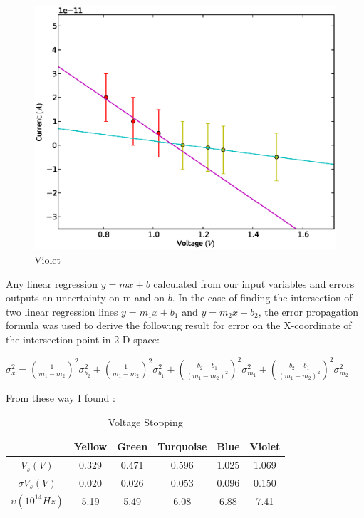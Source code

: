 \documentclass[aps,nofootinbib,onecolumn,groupedaddress,a4paper]{revtex4}
\begin{document}
\begin{figure}[h]
\caption{Violet \label{rawplot}}
\includegraphics[width=1.0 \columnwidth]{mor.eps}
\end{figure}

Any linear regression $y = mx + b$ calculated from our
input variables and errors outputs an uncertainty on m
and on $b$. In the case of finding the intersection of two
linear regression lines $y = m_{1}x+b_{1}$ and $y = m_{2}x+b_{2}$, the
error propagation formula was used to derive the following result for error on the X-coordinate of the intersection point in 2-D space:

\begin{center}


$\sigma_x^2 = \left(\frac{1}{m_1 - m_2}\right)^2 \sigma_{b_2}^2 + 
             \left(\frac{1}{m_1 - m_2}\right)^2 \sigma_{b_1}^2 +
		 \left(\frac{b_2 - b_1}{(m_1 - m_2)^2}\right)^2 \sigma_{m_1}^2 +
		 \left(\frac{b_2 - b_1}{(m_1 - m_2)^2}\right)^2 \sigma_{m_2}^2$
\end{center} 

From these way I found :

\begin{table}[ht]
\caption{Voltage Stopping \label{rawdata}}
\centering
\begin{tabular}{cccccc}
\\
& Yellow & Green & Turquoise & Blue & Violet  \\
\hline
$V_s (V)$& 0.329 &  0.471 &0.596 & 1.025 & 1.069 \\

$\sigma V_s(V)$ &0.020 & 0.026 & 0.053 & 0.096 & 0.150 \\

$\upsilon ({10}^{14}Hz)$ & 5.19 & 5.49 & 6.08 & 6.88 & 7.41 


  
\end{tabular}
\label{default}
\end{table}
\end{document}
